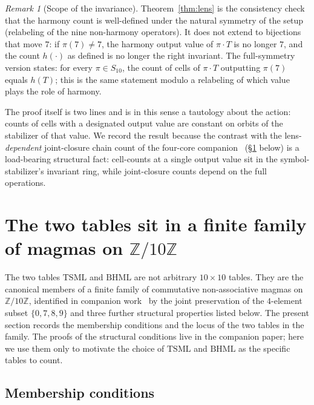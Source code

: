 \documentclass[11pt,reqno]{amsart}
\theoremstyle{plain}
\theoremstyle{definition}
\theoremstyle{remark}
\newtheorem*{remark}{Remark}
\newcommand{\Z}{\mathbb{Z}}
\newcommand{\Zten}{\Z/10\Z}
\newcommand{\TSML}{\mathrm{TSML}}
\newcommand{\BHML}{\mathrm{BHML}}
\begin{document}
\begin{remark}[Scope of the invariance]\label{rem:scope}
Theorem~\ref{thm:lens} is the consistency check that the harmony
count is well-defined under the natural symmetry of the setup
(relabeling of the nine non-harmony operators). It does not
extend to bijections that move $7$: if $\pi(7) \ne 7$, the harmony
output value of $\pi \cdot T$ is no longer $7$, and the count
$h(\cdot)$ as defined is no longer the right invariant. The
full-symmetry version states: for every $\pi \in S_{10}$, the
count of cells of $\pi \cdot T$ outputting $\pi(7)$ equals $h(T)$;
this is the same statement modulo a relabeling of which value
plays the role of harmony.

The proof itself is two lines and is in this sense a tautology
about the action: counts of cells with a designated output value
are constant on orbits of the stabilizer of that value. We record
the result because the contrast with the lens-\emph{dependent}
joint-closure chain count of the four-core
companion~\cite{FourCore} (\S\ref{sec:family} below) is a
load-bearing structural fact: cell-counts at a single output value
sit in the symbol-stabilizer's invariant ring, while joint-closure
counts depend on the full operations.
\end{remark}

\section{The two tables sit in a finite family of magmas on $\Zten$}
\label{sec:family}

The two tables $\TSML$ and $\BHML$ are not arbitrary $10 \times 10$
tables. They are the canonical members of a finite family of
commutative non-associative magmas on $\Zten$, identified in
companion work~\cite{FourCore} by the joint preservation of the
$4$-element subset $\{0, 7, 8, 9\}$ and three further structural
properties listed below. The present section records the
membership conditions and the locus of the two tables in the
family. The proofs of the structural conditions live in the
companion paper; here we use them only to motivate the choice of
$\TSML$ and $\BHML$ as the specific tables to count.

\subsection{Membership conditions}
\end{document}
